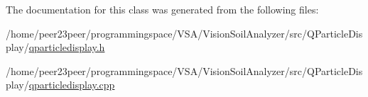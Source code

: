 The documentation for this class was generated from the following files\+:\begin{DoxyCompactItemize}
\item 
/home/peer23peer/programmingspace/\+V\+S\+A/\+Vision\+Soil\+Analyzer/src/\+Q\+Particle\+Display/\hyperlink{qparticledisplay_8h}{qparticledisplay.\+h}\item 
/home/peer23peer/programmingspace/\+V\+S\+A/\+Vision\+Soil\+Analyzer/src/\+Q\+Particle\+Display/\hyperlink{qparticledisplay_8cpp}{qparticledisplay.\+cpp}\end{DoxyCompactItemize}
